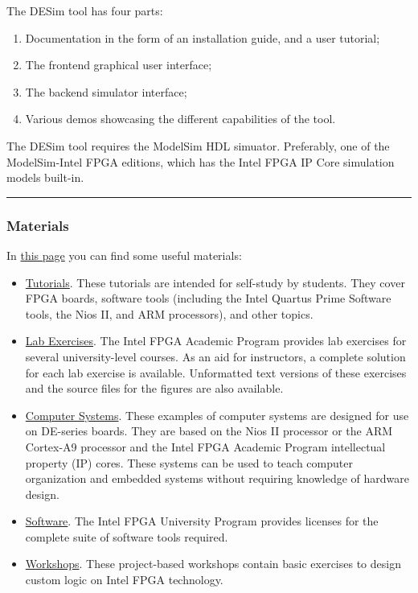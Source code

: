 \documentclass[a4paper]{article}
\newcommand{\longline}{\noindent\rule{\textwidth}{0.4pt}}
\begin{document}
    \noindent
    The DESim tool has four parts:
    \begin{enumerate}
        \item Documentation in the form of an installation guide, and a user tutorial;
        \item The frontend graphical user interface;
        \item The backend simulator interface;
        \item Various demos showcasing the different capabilities of the tool.
    \end{enumerate}
    The DESim tool requires the ModelSim HDL simuator. Preferably, one of the ModelSim-Intel FPGA editions, which has the Intel FPGA IP Core simulation models built-in.
    
    \longline

    \subsubsection{Materials}\label{subsubsection: intel - materials}

    In \href{https://www.intel.com/content/www/us/en/developer/topic-technology/fpga-academic/materials.html}{this page} you can find some useful materials:
    \begin{itemize}
        \item \href{https://fpgacademy.org/tutorials.html}{Tutorials}. These tutorials are intended for self-study by students. They cover FPGA boards, software tools (including the Intel Quartus Prime Software tools, the Nios II, and ARM processors), and other topics.
        
        \item \href{https://fpgacademy.org/courses.html}{Lab Exercises}. The Intel FPGA Academic Program provides lab exercises for several university-level courses. As an aid for instructors, a complete solution for each lab exercise is available. Unformatted text versions of these exercises and the source files for the figures are also available.

        \item \href{https://www.intel.com/content/www/us/en/developer/topic-technology/fpga-academic/materials-computer-systems.html}{Computer Systems}. These examples of computer systems are designed for use on DE-series boards. They are based on the Nios II processor or the ARM Cortex-A9 processor and the Intel FPGA Academic Program intellectual property (IP) cores. These systems can be used to teach computer organization and embedded systems without requiring knowledge of hardware design.

        \item \href{https://fpgacademy.org/tools.html}{Software}. The Intel FPGA University Program provides licenses for the complete suite of software tools required.

        \item \href{https://www.intel.com/content/www/us/en/developer/topic-technology/fpga-academic/materials-workshops.html}{Workshops}. These project-based workshops contain basic exercises to design custom logic on Intel FPGA technology.
    \end{itemize}
\end{document}
